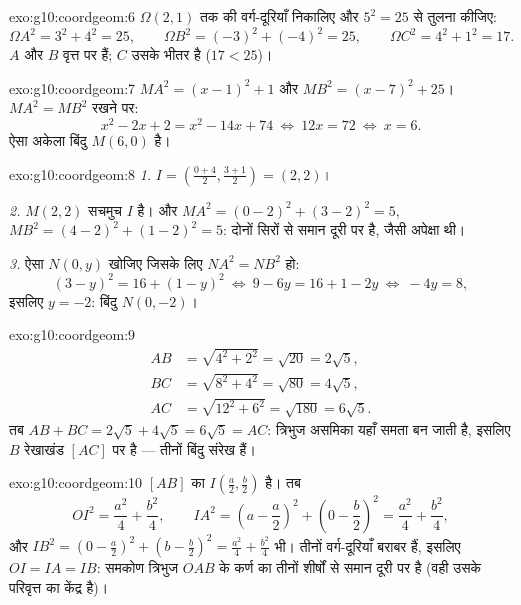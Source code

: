 \begin{solution}{exo:g10:coordgeom:6}
$\Omega(2,1)$ तक की वर्ग-दूरियाँ निकालिए और $5^2 = 25$ से तुलना कीजिए:
\[
\Omega A^2 = 3^2 + 4^2 = 25, \qquad
\Omega B^2 = (-3)^2 + (-4)^2 = 25, \qquad
\Omega C^2 = 4^2 + 1^2 = 17 .
\]
$A$ और $B$ वृत्त पर हैं; $C$ उसके भीतर है ($17 < 25$)।
\end{solution}

\begin{solution}{exo:g10:coordgeom:7}
$MA^2 = (x - 1)^2 + 1$ और $MB^2 = (x - 7)^2 + 25$। $MA^2 = MB^2$ रखने पर:
\[
x^2 - 2x + 2 = x^2 - 14x + 74
\ \Longleftrightarrow\
12x = 72
\ \Longleftrightarrow\
x = 6 .
\]
ऐसा अकेला बिंदु $M(6, 0)$ है।
\end{solution}

\begin{solution}{exo:g10:coordgeom:8}
\emph{1.} $I = \left(\frac{0+4}{2}, \frac{3+1}{2}\right) = (2, 2)$।

\emph{2.} $M(2,2)$ सचमुच $I$ है। और $MA^2 = (0-2)^2 + (3-2)^2 = 5$, $MB^2 = (4-2)^2 + (1-2)^2 = 5$:  दोनों सिरों से समान
दूरी पर है, जैसी अपेक्षा थी।

\emph{3.} ऐसा $N(0, y)$ खोजिए जिसके लिए $NA^2 = NB^2$ हो:
\[
(3 - y)^2 = 16 + (1 - y)^2
\ \Longleftrightarrow\
9 - 6y = 16 + 1 - 2y
\ \Longleftrightarrow\
-4y = 8,
\]
इसलिए $y = -2$: बिंदु $N(0, -2)$।
\end{solution}

\begin{solution}{exo:g10:coordgeom:9}
\begin{align*}
AB &= \sqrt{4^2 + 2^2} = \sqrt{20} = 2\sqrt5, \\
BC &= \sqrt{8^2 + 4^2} = \sqrt{80} = 4\sqrt5, \\
AC &= \sqrt{12^2 + 6^2} = \sqrt{180} = 6\sqrt5 .
\end{align*}
तब $AB + BC = 2\sqrt5 + 4\sqrt5 = 6\sqrt5 = AC$: त्रिभुज असमिका यहाँ समता बन जाती है, इसलिए $B$ रेखाखंड $[AC]$ पर है
--- तीनों बिंदु संरेख हैं।
\end{solution}

\begin{solution}{exo:g10:coordgeom:10}
$[AB]$ का  $I\left(\frac a2, \frac b2\right)$ है। तब
\[
OI^2 = \frac{a^2}{4} + \frac{b^2}{4},
\qquad
IA^2 = \left(a - \frac a2\right)^2 + \left(0 - \frac b2\right)^2
= \frac{a^2}{4} + \frac{b^2}{4},
\]
और $IB^2 = \left(0 - \frac a2\right)^2 + \left(b - \frac b2\right)^2 =
\frac{a^2}{4} + \frac{b^2}{4}$ भी। तीनों वर्ग-दूरियाँ बराबर हैं, इसलिए $OI = IA = IB$: समकोण त्रिभुज $OAB$ के
कर्ण का  तीनों शीर्षों से समान दूरी पर है (वही उसके परिवृत्त का
केंद्र है)।
\end{solution}

